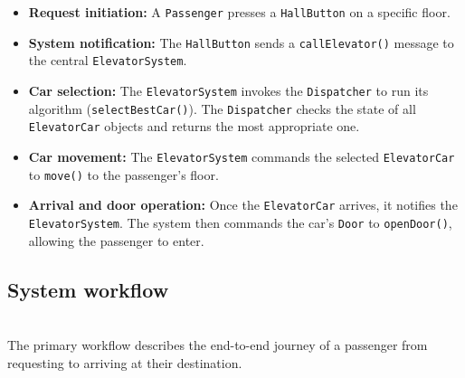 \begin{itemize}
\item
\protect{}\label{DMwtJQoU_7oWLpLirzmgM}
\textbf{Request initiation:} A \texttt{Passenger} presses a \texttt{HallButton} on a specific floor.
\item
\protect{}\label{oQQR1risKsiL9ulw1fK96}
\textbf{System notification:} The \texttt{HallButton} sends a \texttt{callElevator()} message to the central \texttt{ElevatorSystem}.
\item
\protect{}\label{PBeDiMFjl38lmP_QDn0kV}
\textbf{Car selection:} The \texttt{ElevatorSystem} invokes the \texttt{Dispatcher} to run its algorithm (\texttt{selectBestCar()}). The \texttt{Dispatcher} checks the state of all \texttt{ElevatorCar} objects and returns the most appropriate one.
\item
\protect{}\label{wUnC0u0GiO7lh54kTBw4r}
\textbf{Car movement:} The \texttt{ElevatorSystem} commands the selected \texttt{ElevatorCar} to \texttt{move()} to the passenger's floor.
\item
\protect{}\label{HCSHj2rM9HU8yeA5m2JXm}
\textbf{Arrival and door operation:} Once the \texttt{ElevatorCar} arrives, it notifies the \texttt{ElevatorSystem}. The system then commands the car's \texttt{Door} to \texttt{openDoor()}, allowing the passenger to enter.
\end{itemize}

\subsection{System workflow}\label{lCf9x0KC-D_Gz0in7iZcV}
\\
The primary workflow describes the end-to-end journey of a passenger from requesting to arriving at their destination.

